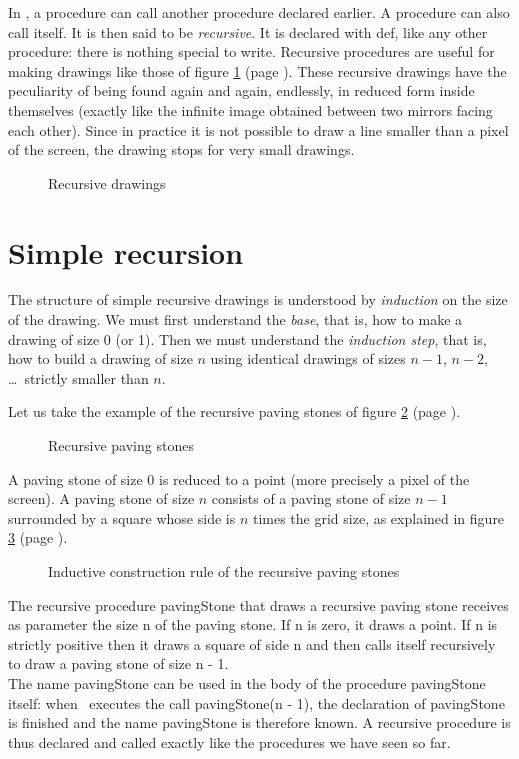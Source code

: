 In \python, a procedure can call another procedure declared earlier.
A procedure can also call itself. It is then said to be
{\em recursive}. It is declared
with {\mcl def}, like any other procedure: there is nothing special to write. Recursive procedures are useful
for making drawings like those of figure \ref{fig:desrec} (page
\pageref{fig:desrec}). These recursive drawings have the peculiarity of being
found again and again, endlessly, in reduced form inside themselves (exactly
like the infinite image obtained between two mirrors facing each other). Since in practice it is
not possible to draw a line smaller than a pixel of the screen, the drawing stops
for very small drawings.
\begin{figure}[htbp]
 \caption{Recursive drawings}\label{fig:desrec}
\end{figure}

\section{Simple recursion}

The structure of simple recursive drawings is understood by {\em induction} on the size of the drawing.
We must first understand the {\em base\/}, that is, how to make a drawing of size 0 (or 1).
Then we must understand the {\em induction step\/}, that is,
how to build a drawing of size $n$ using identical drawings of sizes $n-1$,
$n-2$, \ldots\ strictly smaller than $n$.

Let us take the example of the recursive paving stones
of figure \ref{fig:pavec} (page \pageref{fig:pavec}).
\begin{figure}[htbp]
 \caption{Recursive paving stones}\label{fig:pavec}
\end{figure}
A paving stone of size 0 is reduced to a point (more precisely a pixel of the screen).
A paving stone of size $n$ consists of a paving stone of size $n - 1$
surrounded by a square whose side is $n$ times the grid size, as explained in
figure \ref{fig:indpavec} (page \pageref{fig:indpavec}).
\begin{figure}[htbp]
 \caption{Inductive construction rule of the recursive paving stones}\label{fig:indpavec}
\end{figure}
The recursive procedure {\idt pavingStone} that draws a recursive paving stone receives as parameter the size {\idt n}
of the paving stone. If {\idt n} is zero, it draws a point. If {\idt n} is strictly positive then
it draws a square of side {\idt n} and then calls itself recursively to draw a
paving stone of size {\idt n - 1}.
\ \\

\noindent The name {\idt pavingStone} can be used in the body of the procedure {\idt pavingStone}
itself: when \python\ executes the call {\idt pavingStone(n - 1)}, the declaration of {\idt pavingStone}
is finished and the name {\idt pavingStone} is therefore known. A recursive procedure is thus
declared and called exactly like the procedures we have seen so far.


